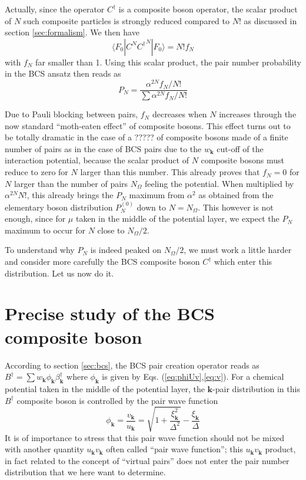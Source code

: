 \documentclass[aps,prb,preprint,groupedaddress,amsmath]{revtex4-1}
\newcommand{\vk}{\ensuremath{\mathbf{k}}}
\newcommand{\dg}{\ensuremath{\dagger}}
\begin{document}
Actually,  since the operator $C^\dg$ is a composite boson operator, the scalar product of $N$ such composite particles is strongly reduced compared to $N!$ as discussed in section \ref{sec:formalism}.  We then have 
\begin{equation}
\langle{}F_0|{C}^N{C^\dg}^N|F_0{\rangle}=N!f_N
\end{equation}
with $f_N$ far smaller than 1.  Using this scalar product, the pair number probability in the BCS ansatz then reads as
\begin{equation}
P_N=\frac{\alpha^{2N}f_N/N!}{\sum\alpha^{2N}f_N/N!}
\end{equation}

Due to  Pauli blocking between pairs,  $f_N$ decreases when $N$ increases through the now standard ``moth-eaten effect'' of composite bosons. This effect turns out to be totally dramatic in the case of a ?????  of composite bosons made of a finite number of pairs as in the case of BCS pairs due to the  $w_\vk$ cut-off of  the interaction potential, because the scalar product of $N$ composite bosons must reduce to zero for $N$ larger than this number.  This already proves that $f_N=0$ for $N$ larger than the number of pairs $N_\Omega$ feeling the potential.  When multiplied by $\alpha^{2N}N!$, this already brings the $P_N$ maximum from $\alpha^2$ as obtained from the elementary boson distribution $P_N^{(0)}$ down to $N=N_\Omega$. This however is not enough, since   for $\mu$ taken in the middle of the potential layer, we expect the $P_N$ maximum to occur for $N$ close to $N_\Omega/2$.

To understand why $P_N$ is indeed peaked on $N_\Omega/2$, we must work a little harder and consider more carefully the BCS composite boson $C^\dg$ which enter this distribution.  Let us now do it.  
\section{Precise study of the BCS composite boson}
According to section \ref{sec:bcs}, the BCS pair creation operator reads as  $B^\dg=\sum{}w_\vk\phi_\vk\beta^\dg_\vk$ where $\phi_\vk$ is given by Eqs. (\ref{eq:phiUv},\ref{eq:v}).  For a chemical potential taken in the middle of the potential layer, the $\vk$-pair distribution in this  $B^\dg$ composite boson is  controlled by the pair wave function
\begin{equation}
\phi_\vk=\frac{v_\vk}{u_\vk}=\sqrt{1+\frac{\xi_\vk^2}{\Delta^2}}-\frac{\xi_\vk}{\Delta}
\end{equation}
It is of importance to stress that this pair wave function should not be mixed with another quantity $u_\vk{}v_\vk$ often called ``pair wave function''; this $u_\vk{}v_\vk$ product, in fact related to the concept of ``virtual pairs'' does not enter the pair number distribution that we here want to determine.   
\end{document}
